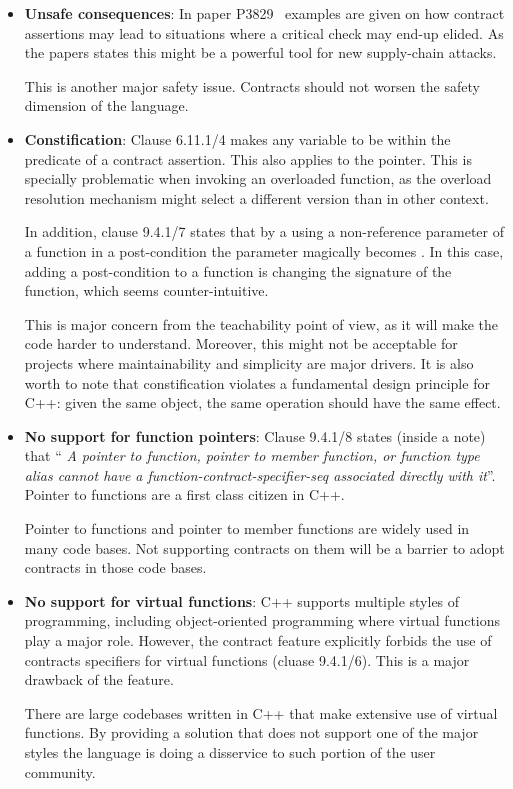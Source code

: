 \begin{itemize}
\item \textbf{Unsafe consequences}: In paper P3829~\cite{p3829r0} examples are
given on how contract assertions may lead to situations where a critical check
may end-up elided. As the papers states this might be a powerful tool for new
supply-chain attacks.

This is another major safety issue. Contracts should not worsen the safety
dimension of the language.

\item \textbf{Constification}: Clause 6.11.1/4 makes any variable to be
 within the predicate of a contract assertion. This also applies
to the  pointer. This is specially problematic when invoking an
overloaded function, as the overload resolution mechanism might select a
different version than in other context.

In addition, clause 9.4.1/7 states that by a using a non-reference parameter of
a function in a post-condition the parameter magically becomes .
In this case, adding a post-condition to a function is changing the signature of
the function, which seems counter-intuitive.

This is major concern from the teachability point of view, as it will make the
code harder to understand. Moreover, this might not be acceptable for projects
where maintainability and simplicity are major drivers. It is also worth to
note that constification violates a fundamental design principle for C++: given
the same object, the same operation should have the same effect.

\item \textbf{No support for function pointers}: Clause 9.4.1/8 states (inside a
note) that ``\emph{ A pointer to function, pointer to member function, or function
type alias cannot have a function-contract-specifier-seq associated directly
with it}''. Pointer to functions are a first class citizen in C++.

Pointer to functions and pointer to member functions are widely used in many
code bases. Not supporting contracts on them will be a barrier to adopt
contracts in those code bases.

\item \textbf{No support for virtual functions}: C++ supports multiple styles of
programming, including object-oriented programming where virtual functions play
a major role. However, the contract feature explicitly forbids the use of
contracts specifiers for virtual functions (cluase 9.4.1/6). This is a major
drawback of the feature.

There are large codebases written in C++ that make extensive use of virtual
functions. By providing a solution that does not support one of the major styles
the language is doing a disservice to such portion of the user community.


\end{itemize}
